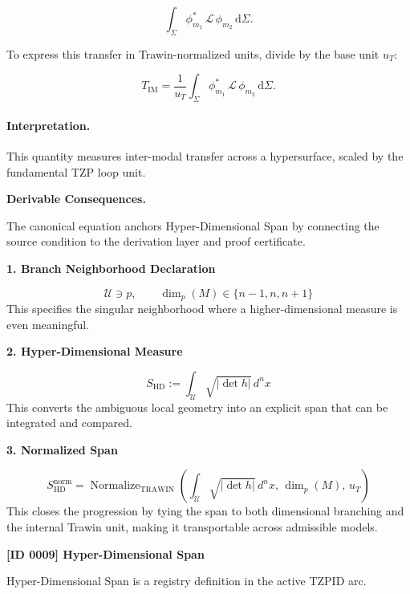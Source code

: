 \begin{equation}
\int_{\Sigma}
\phi_{m_1}^{*}
\,\mathcal{L}\,
\phi_{m_2}
\,\mathrm{d}\Sigma .
\end{equation}

To express this transfer in Trawin-normalized units, divide by the base unit $u_T$:

\begin{equation}
T_{\mathrm{IM}}
=
\frac{1}{u_T}
\int_{\Sigma}
\phi_{m_1}^{*}
\,\mathcal{L}\,
\phi_{m_2}
\,\mathrm{d}\Sigma .
\end{equation}

\paragraph{Interpretation.}
This quantity measures inter-modal transfer across a hypersurface, scaled by the fundamental TZP loop unit.

\par\vspace{0.35em}
\noindent\textbf{Derivable Consequences.}\quad
\begingroup
\footnotesize
\raggedright
The canonical equation anchors Hyper-Dimensional Span by connecting the source condition to the derivation layer and proof certificate.
\par\endgroup

\noindent\textbf{1. Branch Neighborhood Declaration}\par
\[
\mathcal U \ni p,
\qquad
\dim_{p}(M)\in\{n-1,n,n+1\}
\]
\noindent This specifies the singular neighborhood where a higher-dimensional measure is even meaningful.\par
\noindent\textbf{2. Hyper-Dimensional Measure}\par
\[
S_{\mathrm{HD}}
:=
\int_{\mathcal U}
\sqrt{\lvert \det h \rvert}\, d^{n}x
\]
\noindent This converts the ambiguous local geometry into an explicit span that can be integrated and compared.\par
\noindent\textbf{3. Normalized Span}\par
\[
S_{\mathrm{HD}}^{\mathrm{norm}}
=
\operatorname{Normalize}_{\mathrm{TRAWIN}}
\!\left(
\int_{\mathcal U}\sqrt{\lvert \det h \rvert}\, d^{n}x,\,
\dim_{p}(M),\,
u_{T}
\right)
\]
\noindent This closes the progression by tying the span to both dimensional branching and the internal Trawin unit, making it transportable across admissible models.\par

\clearpage
\noindent\textbf{[ID 0009] Hyper-Dimensional Span}\par
\vspace{0.35em}
\begingroup\small
{}
Hyper-Dimensional Span is a registry definition in the active TZPID arc.

